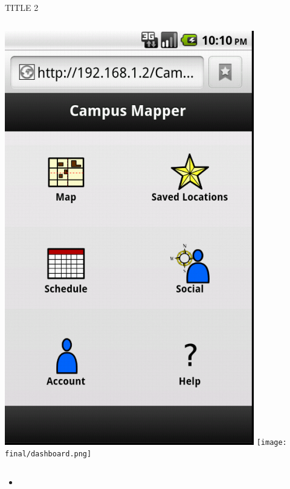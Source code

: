 \documentclass{beamer}
\begin{document}
\begin{frame}{TITLE 2}
    \begin{columns}[c]
        \center\includegraphics[height=0.5 \textheight]{final-pre-h/dashboard.png}
        \center\texttt{[image: final/dashboard.png]}
    \end{columns}
    \begin{itemize}
        \item 
    \end{itemize}
\end{frame}
\end{document}
